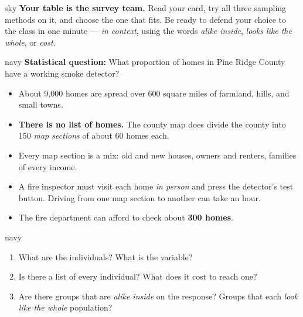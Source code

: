 \documentclass[12pt]{article}
\newcommand{\answerspace}[2]{\par\nopagebreak\noindent\begin{minipage}[t][#1][t]{\linewidth}%
  \color{keyred}\bfseries\footnotesize #2\end{minipage}\par}
\begin{document}

\boxguard[10]
\begin{headlinebox}{sky}
\small
\textbf{Your table is the survey team.} Read your card, try all three sampling methods on it,
and choose the one that fits. Be ready to defend your choice to the class in one minute ---
\emph{in context}, using the words \emph{alike inside}, \emph{looks like the whole}, or
\emph{cost}.
\end{headlinebox}

\vspace{0.08in}

\boxguard[12]
\begin{scenariobox}{navy}
\small
\textbf{Statistical question:} What proportion of homes in Pine Ridge County have a working
smoke detector?
\begin{itemize}[leftmargin=1.3em, itemsep=2pt, topsep=4pt]
  \item About 9{,}000 homes are spread over 600 square miles of farmland, hills, and small
        towns.
  \item \textbf{There is no list of homes.} The county map does divide the county into 150
        \emph{map sections} of about 60 homes each.
  \item Every map section is a mix: old and new houses, owners and renters, families of every
        income.
  \item A fire inspector must visit each home \emph{in person} and press the detector's test
        button. Driving from one map section to another can take an hour.
  \item The fire department can afford to check about \textbf{300 homes}.
\end{itemize}
\end{scenariobox}

\vspace{0.08in}

\boxguard[10]
\begin{scenariobox}{navy}
\small
\begin{enumerate}[label=\textbf{\alph*.}, leftmargin=1.6em, itemsep=4pt]
  \item What are the individuals? What is the variable?
        \answerspace{1.1cm}{}
  \item Is there a list of every individual? What does it cost to reach one?
        \answerspace{1.3cm}{}
  \item Are there groups that are \emph{alike inside} on the response? Groups that each
        \emph{look like the whole} population?
        \answerspace{1.3cm}{}
\end{enumerate}
\end{scenariobox}
\end{document}
